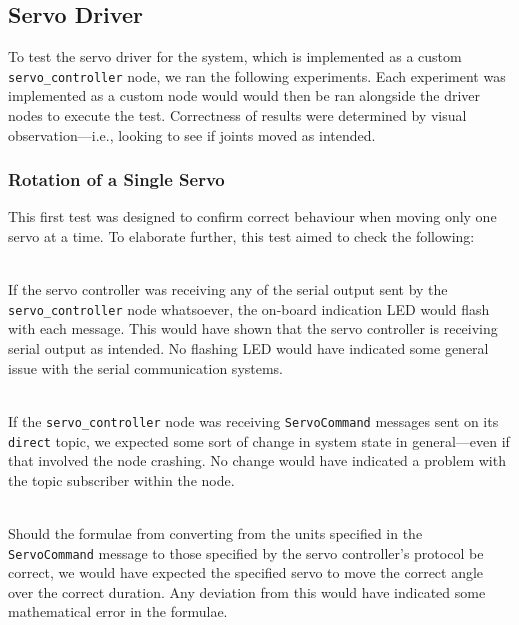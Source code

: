 \subsection{Servo Driver}

To test the servo driver for the system, which is implemented as a custom \texttt{servo\_controller} node, we ran the following experiments. Each experiment was implemented as a custom node would would then be ran alongside the driver nodes to execute the test. Correctness of results were determined by visual observation---i.e., looking to see if joints moved as intended. 

\subsubsection{Rotation of a Single Servo}

This first test was designed to confirm correct behaviour when moving only one servo at a time. To elaborate further, this test aimed to check the following:

\begin{description}[labelindent=\parindent]
	\item[Hardware Communication] \hfill \\
	If the servo controller was receiving any of the serial output sent by the \texttt{servo\_controller} node whatsoever, the on-board indication LED would flash with each message. This would have shown that the servo controller is receiving serial output as intended. No flashing LED would have indicated some general issue with the serial communication systems.

	\item[Topic Reception] \hfill \\
	If the \texttt{servo\_controller} node was receiving \texttt{ServoCommand} messages sent on its \texttt{direct} topic, we expected some sort of change in system state in general---even if that involved the node crashing. No change would have indicated a problem with the topic subscriber within the node.

	\item[Index, Angle \& Duration Conversion] \hfill \\
	Should the formulae from converting from the units specified in the \texttt{ServoCommand} message to those specified by the servo controller's protocol be correct, we would have expected the specified servo to move the correct angle over the correct duration. Any deviation from this would have indicated some mathematical error in the formulae.
\end{description}

